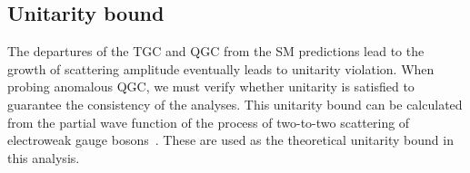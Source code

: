 
\subsection{Unitarity bound}
The departures of the TGC and QGC from the SM predictions lead to the growth of scattering amplitude eventually leads to unitarity violation.
When probing anomalous QGC, we must verify whether unitarity is satisfied to guarantee the consistency of the analyses.
This unitarity bound can be calculated from the partial wave function of the process of two-to-two scattering of electroweak gauge bosons~\cite{PhysRevD.101.113003}.
These are used as the theoretical unitarity bound in this analysis.


